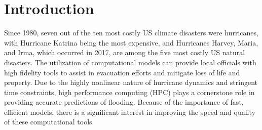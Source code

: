 \chapter{Introduction}%

Since 1980, seven out of the ten most costly US climate disasters were hurricanes, with Hurricane Katrina being the most expensive\cite{NCEI2018}, and Hurricanes Harvey, Maria, and Irma, which occurred in 2017, are among the five most costly US natural disasters.
The utilization of computational models can provide local officials with high fidelity tools to assist in evacuation efforts and mitigate loss of life and property.
Due to the highly nonlinear nature of hurricane dynamics and stringent time constraints, high performance computing (HPC) plays a cornerstone role in providing accurate predictions of flooding.
Because of the importance of fast, efficient models, there is a significant interest in improving the speed and quality of these computational tools.

